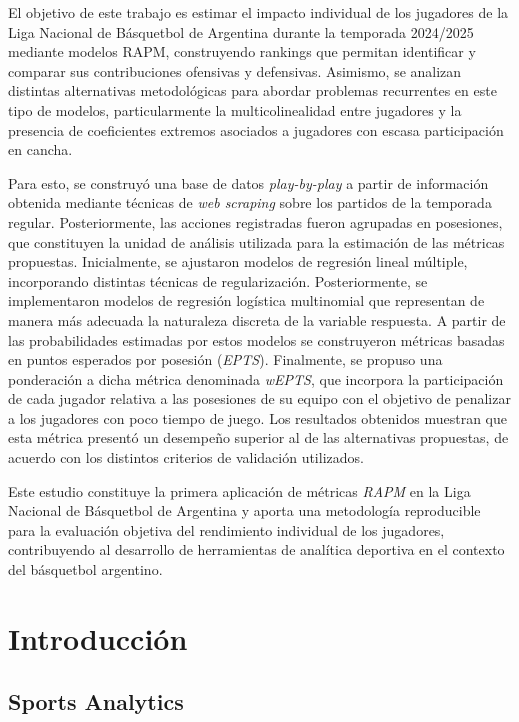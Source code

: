 \documentclass[
]{article}
\begin{document}
El objetivo de este trabajo es estimar el impacto individual de los
jugadores de la Liga Nacional de Básquetbol de Argentina durante la
temporada 2024/2025 mediante modelos RAPM, construyendo rankings que
permitan identificar y comparar sus contribuciones ofensivas y
defensivas. Asimismo, se analizan distintas alternativas metodológicas
para abordar problemas recurrentes en este tipo de modelos,
particularmente la multicolinealidad entre jugadores y la presencia de
coeficientes extremos asociados a jugadores con escasa participación en
cancha.

Para esto, se construyó una base de datos \emph{play-by-play} a partir
de información obtenida mediante técnicas de \emph{web scraping} sobre
los partidos de la temporada regular. Posteriormente, las acciones
registradas fueron agrupadas en posesiones, que constituyen la unidad de
análisis utilizada para la estimación de las métricas propuestas.
Inicialmente, se ajustaron modelos de regresión lineal múltiple,
incorporando distintas técnicas de regularización. Posteriormente, se
implementaron modelos de regresión logística multinomial que representan
de manera más adecuada la naturaleza discreta de la variable respuesta.
A partir de las probabilidades estimadas por estos modelos se
construyeron métricas basadas en puntos esperados por posesión
(\emph{EPTS}). Finalmente, se propuso una ponderación a dicha métrica
denominada \emph{wEPTS}, que incorpora la participación de cada jugador
relativa a las posesiones de su equipo con el objetivo de penalizar a
los jugadores con poco tiempo de juego. Los resultados obtenidos
muestran que esta métrica presentó un desempeño superior al de las
alternativas propuestas, de acuerdo con los distintos criterios de
validación utilizados.

Este estudio constituye la primera aplicación de métricas \emph{RAPM} en
la Liga Nacional de Básquetbol de Argentina y aporta una metodología
reproducible para la evaluación objetiva del rendimiento individual de
los jugadores, contribuyendo al desarrollo de herramientas de analítica
deportiva en el contexto del básquetbol argentino.

\newpage

\section{Introducción}\label{introducciuxf3n}

\subsection{Sports Analytics}\label{sports-analytics}
\end{document}
